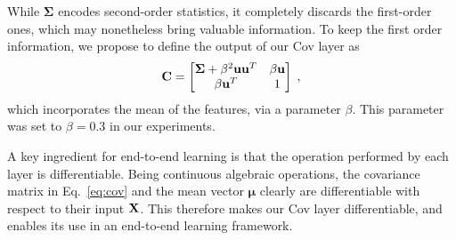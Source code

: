 While $\boldsymbol{\Sigma}$ encodes second-order statistics, it completely discards the first-order ones, which may nonetheless bring valuable information. To keep the first order information, we propose to define the output of our Cov layer as
\begin{equation} \label{eq:cov_est}
{\bf C} =
\begin{bmatrix}
\boldsymbol{\Sigma} + \beta^2 {\bf u}{\bf u}^T
& \beta {\bf u} \\
\beta {\bf u}^T & 1 \\
\end{bmatrix} \;,
\end{equation}
which incorporates the mean of the features, via a parameter $\beta$. This parameter was set to $\beta = 0.3$ in our experiments.

A key ingredient for end-to-end learning is that the operation performed by each layer is differentiable. Being continuous algebraic operations, the covariance matrix in Eq.~\ref{eq:cov} and the mean vector $\boldsymbol{\mu}$ clearly are differentiable with respect to their input ${\bf X}$. This therefore makes our Cov layer differentiable, and enables its use in an end-to-end learning framework.


